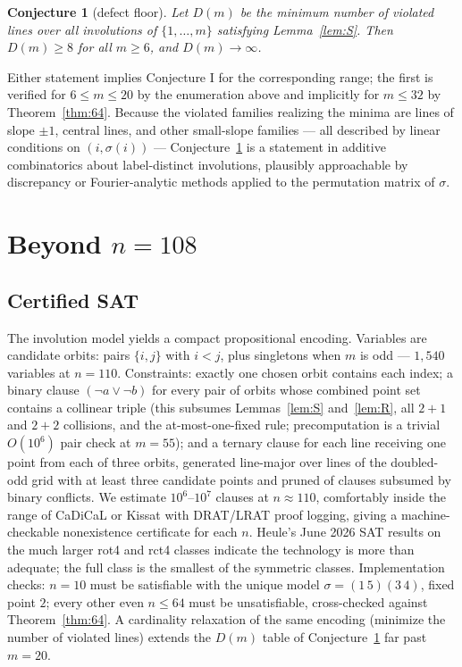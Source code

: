 \documentclass[11pt]{article}
\newtheorem{conjecture}{Conjecture}
\theoremstyle{remark}
\begin{document}
\begin{conjecture}[defect floor]\label{conj:floor}
Let $D(m)$ be the minimum number of violated lines over all involutions of
$\{1,\dots,m\}$ satisfying Lemma~\ref{lem:S}.
Then $D(m)\ge 8$ for all $m\ge 6$, and $D(m)\to\infty$.
\end{conjecture}

Either statement implies Conjecture I for the corresponding range;
the first is verified for $6\le m\le 20$ by the enumeration above and
implicitly for $m\le 32$ by Theorem~\ref{thm:64}.
Because the violated families realizing the minima are lines of slope
$\pm1$, central lines, and other small-slope families ---
all described by linear conditions on $(i,\sigma(i))$ ---
Conjecture~\ref{conj:floor} is a statement in additive combinatorics about
label-distinct involutions,
plausibly approachable by discrepancy or Fourier-analytic methods applied to
the permutation matrix of $\sigma$.

\section{Beyond $n=108$}\label{sec:beyond}

\subsection{Certified SAT}

The involution model yields a compact propositional encoding.
Variables are candidate orbits:
pairs $\{i,j\}$ with $i<j$,
plus singletons when $m$ is odd ---
$1{,}540$ variables at $n=110$.
Constraints:
exactly one chosen orbit contains each index;
a binary clause $(\lnot a\vee\lnot b)$ for every pair of orbits whose
combined point set contains a collinear triple
(this subsumes Lemmas~\ref{lem:S} and~\ref{lem:R},
all $2{+}1$ and $2{+}2$ collisions,
and the at-most-one-fixed rule;
precomputation is a trivial $O(10^{6})$ pair check at $m=55$);
and a ternary clause for each line receiving one point from each of three
orbits,
generated line-major over lines of the doubled-odd grid with at least three
candidate points and pruned of clauses subsumed by binary conflicts.
We estimate $10^{6}$--$10^{7}$ clauses at $n\approx110$,
comfortably inside the range of CaDiCaL or Kissat with DRAT/LRAT proof
logging,
giving a machine-checkable nonexistence certificate for each $n$.
Heule's June 2026 SAT results on the much larger \textsf{rot4} and
\textsf{rct4} classes \cite{FlamSite} indicate the technology is more than
adequate;
the full class is the smallest of the symmetric classes.
Implementation checks:
$n=10$ must be satisfiable with the unique model $\sigma=(1\,5)(3\,4)$,
fixed point $2$;
every other even $n\le 64$ must be unsatisfiable,
cross-checked against Theorem~\ref{thm:64}.
A cardinality relaxation of the same encoding
(minimize the number of violated lines)
extends the $D(m)$ table of Conjecture~\ref{conj:floor} far past $m=20$.
\end{document}
